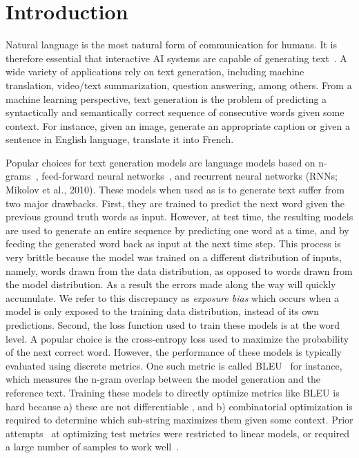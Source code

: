 \section{Introduction}
Natural language is the most natural form of communication for humans. It is therefore essential that interactive AI systems are capable of generating text~\citep{textgen}.
A wide variety of applications rely on text generation, including machine translation, video/text summarization, question answering, among others. 
From a machine learning perspective, text generation is the problem of predicting a syntactically and semantically correct sequence of consecutive words given some context. For instance, given an image,  generate an appropriate caption or given a sentence in English language, translate it into French. 

Popular choices for text generation models are language models based on n-grams~\citep{kneser+ney1995}, feed-forward neural networks~\citep{nlm}, and recurrent neural networks (RNNs; Mikolov et al., 2010)\nocite{mikolov-2010}. These models when used as is to generate text suffer from two major drawbacks. First, they are trained to predict the next word given the previous ground truth words as input. 
However, at test time, the resulting models are used to generate an entire sequence by predicting one word at a time, and by feeding the generated word back as input at the next time step.
This process is very brittle because the model was trained on a different distribution of inputs, namely, words drawn from the data distribution, as opposed to words drawn from the model distribution. As a result the errors made along the way will quickly accumulate.
We refer to this discrepancy as \textit{exposure bias} which occurs when a model is only exposed to the training data distribution, instead of its own predictions. 
Second, the loss function used to train these models is at the word level. A popular choice is the cross-entropy loss used to maximize the probability of the next correct word. However, the performance of these models is typically evaluated using discrete metrics. One such metric is called BLEU~\citep{bleu} for instance, which measures the n-gram overlap between the model generation and the reference text. Training these models to directly optimize metrics like BLEU is hard because a) these are not differentiable \citep{rosti2011}, and b) combinatorial optimization is required to determine which sub-string maximizes them given some context. Prior attempts~\citep{mcallister2010,he12} at optimizing test metrics were restricted to linear models, or required a large number of samples to work well~\citep{auli2014}.

